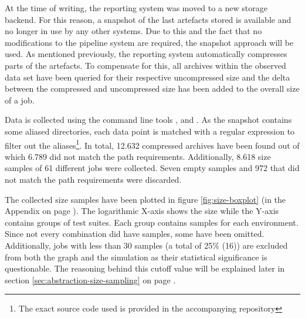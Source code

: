     At the time of writing, the reporting system was moved to a new storage backend. For this reason, a snapshot of the last artefacts stored is available and no longer in use by any other systems. Due to this and the fact that no modifications to the pipeline system are required, the snapshot approach will be used. As mentioned previously, the reporting system automatically compresses parts of the artefacts. To compensate for this, all archives within the observed data set have been queried for their respective uncompressed size and the delta between the compressed and uncompressed size has been added to the overall size of a job.
    
    Data is collected using the command line tools ,  and . As the snapshot contains some aliased directories, each data point is matched with a regular expression to filter out the aliases\footnote{The exact source code used is provided in the accompanying repository}. In total, 12.632 compressed archives have been found out of which 6.789 did not match the path requirements. Additionally, 8.618 size samples of 61 different jobs were collected. Seven empty samples and 972 that did not match the path requirements were discarded.
    
    The collected size samples have been plotted in figure \ref{fig:size-boxplot} (in the Appendix on page \pageref{fig:size-boxplot}). The logarithmic X-axis shows the size while the Y-axis contains groups of test suites. Each group contains samples for each environment. Since not every combination did have samples, some have been omitted. Additionally, jobs with less than 30 samples (a total of 25\% (16)) are excluded from both the graph and the simulation as their statistical significance is questionable. The reasoning behind this cutoff value will be explained later in section \ref{sec:abstraction-size-sampling} on page \pageref{sec:abstraction-size-sampling}.
    
